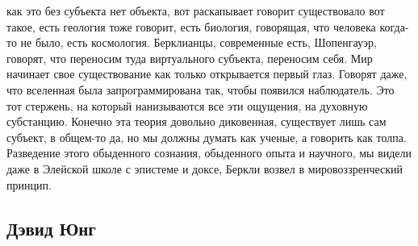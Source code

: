 \documentclass[a4paper, 12pt]{article}
\begin{document}
как это без субъекта нет объекта, вот раскапывает говорит существовало 
вот такое, есть геология тоже говорит, есть биология, говорящая, что 
человека когда-то не было, есть космология. Берклианцы, современные 
есть, Шопенгауэр, говорят, что переносим туда виртуального субъекта, 
переносим себя. Мир начинает свое существование как только открывается 
первый глаз. Говорят даже, что вселенная была запрограммирована так, 
чтобы появился наблюдатель. Это тот стержень, на который нанизываются 
все эти ощущения, на духовную субстанцию. Конечно эта теория довольно 
диковенная, существует лишь сам субъект, в общем-то да, но мы должны 
думать как ученые, а говорить как толпа. Разведение этого обыденного 
сознания, обыденного опыта и научного, мы видели даже в Элейской школе 
с эпистеме и доксе, Беркли возвел в мировоззренческий принцип.


\subsection{Дэвид Юнг}
\end{document}
